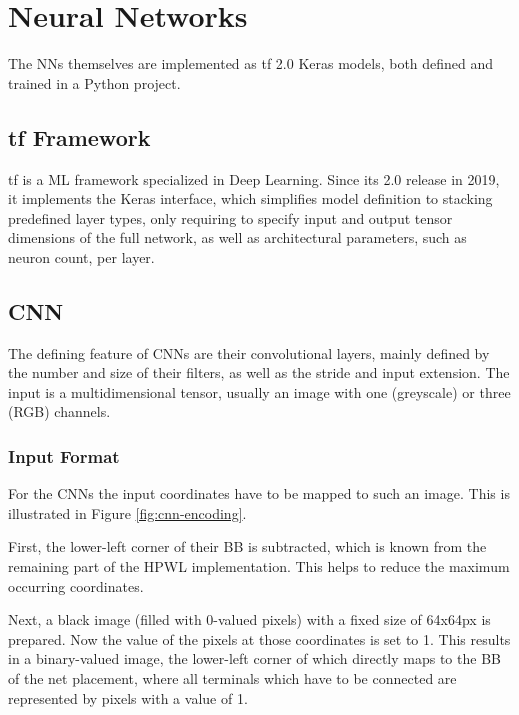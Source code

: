\section{Neural Networks}

The \glspl{NN} themselves are implemented as \gls{tf} 2.0 Keras models, both defined and trained in a Python project.

\subsection{\gls{tf} Framework}

\gls{tf} is a \gls{ML} framework specialized in Deep Learning\cite{tensorflow2015-whitepaper}. Since its 2.0 release in 2019, it implements the Keras interface\cite{chollet2015keras}, which simplifies model definition to stacking predefined layer types, only requiring to specify input and output tensor dimensions of the full network, as well as architectural parameters, such as neuron count, per layer.

\subsection{\gls{CNN}}

The defining feature of \glspl{CNN} are their convolutional layers, mainly defined by the number and size of their filters, as well as the stride and input extension. The input is a multidimensional tensor, usually an image with one (greyscale) or three (RGB) channels.

\subsubsection{Input Format}

For the \glspl{CNN} the input coordinates have to be mapped to such an image. This is illustrated in Figure \ref{fig:cnn-encoding}.

First, the lower-left corner of their \gls{BB} is subtracted, which is known from the remaining part of the \gls{HPWL} implementation. This helps to reduce the maximum occurring coordinates.

Next, a black image (filled with 0-valued pixels) with a fixed size of 64x64px is prepared. Now the value of the pixels at those coordinates is set to 1. This results in a binary-valued image, the lower-left corner of which directly maps to the \gls{BB} of the net placement, where all terminals which have to be connected are represented by pixels with a value of 1.


